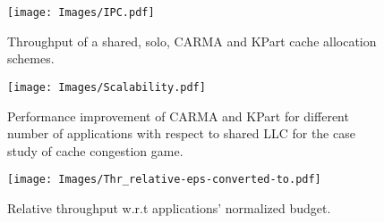 \begin{figure}[!tb]
\centering
\texttt{[image: Images/IPC.pdf]}
\caption{Throughput of a shared, solo, CARMA and KPart cache allocation schemes.}
\label{fig:IPC_mix}
\end{figure}
\begin{figure}[!tb]
\centering
\texttt{[image: Images/Scalability.pdf]}
\caption{Performance improvement of CARMA and KPart for different number of applications with respect to shared LLC for the case study of cache congestion game.}
\label{fig:scalability}
\end{figure}
\begin{figure}[!tb]
\centering
\texttt{[image: Images/Thr\_relative-eps-converted-to.pdf]}
\caption{Relative throughput w.r.t applications' normalized budget.}
\label{fig:Relative_Thr}
\vspace{-1\baselineskip}
\end{figure}
